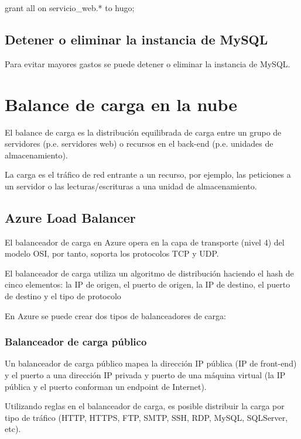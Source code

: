 grant all on servicio\_web.* to hugo;

\section{Detener o eliminar la instancia de MySQL}

Para evitar mayores gastos se puede detener o eliminar la instancia de MySQL.

\clearpage


\chapter{Balance de carga en la nube}

El balance de carga es la distribución equilibrada de carga entre un grupo de servidores (p.e. servidores web) o recursos en el back-end (p.e. unidades de almacenamiento).

La carga es el tráfico de red entrante a un recurso, por ejemplo, las peticiones a un servidor o las lecturas/escrituras a una unidad de almacenamiento.

\section{Azure Load Balancer}

El balanceador de carga en Azure opera en la capa de transporte (nivel 4) del modelo OSI, por tanto, soporta los protocolos TCP y UDP.

El balanceador de carga utiliza un algoritmo de distribución haciendo el hash de cinco elementos: la IP de origen, el puerto de origen, la IP de destino, el puerto de destino y el tipo de protocolo

En Azure se puede crear dos tipos de balanceadores de carga:

\subsection{Balanceador de carga público}

Un balanceador de carga público mapea la dirección IP pública (IP de front-end) y el puerto a una dirección IP privada y puerto de una máquina virtual (la IP pública y el puerto conforman un endpoint de Internet).

Utilizando reglas en el balanceador de carga, es posible distribuir la carga por tipo de tráfico (HTTP, HTTPS, FTP, SMTP, SSH, RDP, MySQL, SQLServer, etc).

